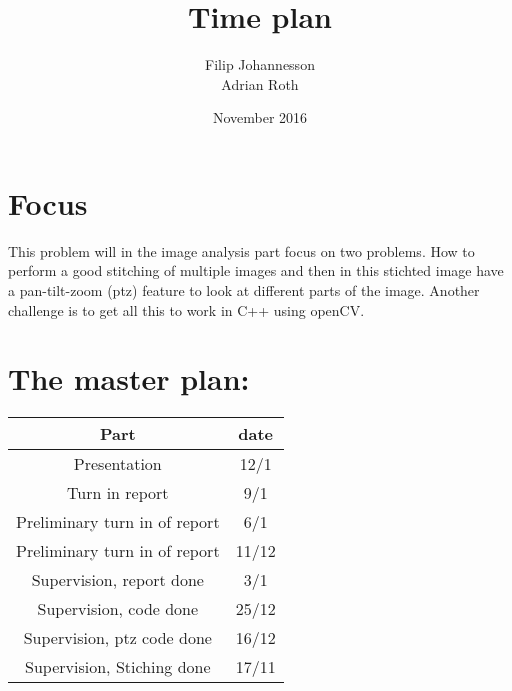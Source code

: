 \documentclass{article}
\title{Time plan}
\author{Filip Johannesson\\ Adrian Roth}
\date{November 2016}
\begin{document}
\maketitle

\section*{Focus}
This problem will in the image analysis part focus on two problems. How to perform a good stitching of multiple images and then in this stichted image have a pan-tilt-zoom (ptz) feature to look at different parts of the image. Another challenge is to get all this to work in C++ using openCV.

\section*{The master plan:}

\begin{center}
  \begin{tabular}{c||c}
  Part &  date\\ \hline
  Presentation & 12/1 \\
  Turn in report & 9/1 \\
  Preliminary turn in of report & 6/1 \\
  Preliminary turn in of report & 11/12 \\
  Supervision, report done & 3/1 \\
  Supervision, code done & 25/12 \\
  Supervision, ptz code done & 16/12 \\
  Supervision, Stiching done & 17/11
  \end{tabular}
\end{center}
\end{document}
